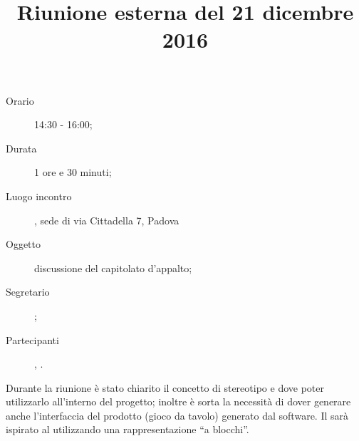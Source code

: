 


\author{\PB}
\supervisor{\MM}
\title{Riunione esterna del 21 dicembre 2016}



\maketitle

\begin{description}
	\item[Orario] 14:30 - 16:00;
	\item[Durata] 1 ore e 30 minuti;
	\item[Luogo incontro] \ZU, sede di via Cittadella 7, Padova
	\item[Oggetto] discussione del capitolato d'appalto;
	\item[Segretario] \AZ; 
	\item[Partecipanti] \GP, \ALL.
\end{description}

Durante la riunione è stato chiarito il concetto di stereotipo e dove poter utilizzarlo all'interno del progetto; inoltre è sorta la necessità di dover generare anche l'interfaccia del prodotto (gioco da tavolo) generato dal software. Il  sarà ispirato al  utilizzando una rappresentazione “a blocchi”.


